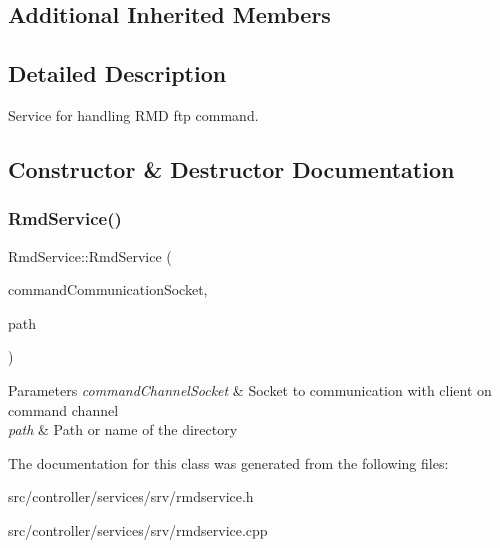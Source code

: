 \subsection*{Additional Inherited Members}


\subsection{Detailed Description}
Service for handling R\+MD ftp command. 

\subsection{Constructor \& Destructor Documentation}
\mbox{\label{classRmdService_a1155d2f6f6c4de461e9fb79cdc681e44}} 
\subsubsection{\texorpdfstring{Rmd\+Service()}{RmdService()}}
{\footnotesize\ttfamily Rmd\+Service\+::\+Rmd\+Service (\begin{DoxyParamCaption}\item[{int}]{command\+Communication\+Socket,  }\item[{const Q\+String \&}]{path }\end{DoxyParamCaption})}


\begin{DoxyParams}{Parameters}
{\em command\+Channel\+Socket} & Socket to communication with client on command channel \\
\hline
{\em path} & Path or name of the directory \\
\hline
\end{DoxyParams}


The documentation for this class was generated from the following files\+:\begin{DoxyCompactItemize}
\item 
src/controller/services/srv/rmdservice.\+h\item 
src/controller/services/srv/rmdservice.\+cpp\end{DoxyCompactItemize}
